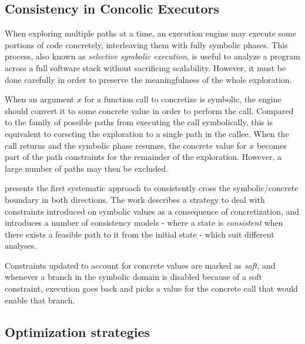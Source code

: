 \subsection{Consistency in Concolic Executors}  %

When exploring multiple paths at a time, an execution engine may execute some portions of code concretely, interleaving them with fully symbolic phases. This process, also known as {\em selective symbolic execution}, is useful to analyze a program across a full software stack without sacrificing scalability. However, it must be done carefully in order to preserve the meaningfulness of the whole exploration.

When an argument $x$ for a function call to concretize is symbolic, the engine should convert it to some concrete value in order to perform the call. Compared to the family of possible paths from executing the call symbolically, this is equivalent to corseting the exploration to a single path in the callee. When the call returns and the symbolic phase resumes, the concrete value for $x$ becomes part of the path constraints for the remainder of the exploration. However, a large number of paths may then be excluded.

\cite{CKC-TOCS12} presents the first systematic approach to consistently cross the symbolic/concrete boundary in both directions. The work describes a strategy to deal with constraints introduced on symbolic values as a consequence of concretization, and introduces a number of consistency models - where a state is {\em consistent} when there exists a feasible path to it from the initial state - which suit different analyses.

Constraints updated to account for concrete values are marked as {\em soft}, and whenever a branch in the symbolic domain is disabled because of a soft constraint, execution goes back and picks a value for the concrete call that would enable that branch.


\subsection{Optimization strategies} 
\label{function-summaries}

